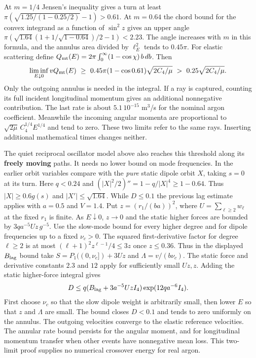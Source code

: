 \documentclass[11pt,a4paper]{article}
\begin{document}
At \(m=1/4\) Jensen's inequality gives a turn at least
\(\pi(\sqrt{1.25/(1-0.25/2)}-1)>0.61\). At \(m=0.64\) the chord bound
for the convex integrand as a function of \(\sin^2 z\) gives an upper
angle \(\pi(\sqrt{1.64}(1+1/\sqrt{1-0.64})/2-1)<2.23\). The angle
increases with \(m\) in this formula, and the annulus area divided by
\(\ell_E^2\) tends to \(0.45\pi\). For elastic scattering define
\(Q_{\rm mt}(E)=2\pi\int_0^\infty(1-\cos\chi)\,b\,db\). Then \[
 \liminf_{E\downarrow0}vQ_{\rm mt}(E)
 \ \ge\ 0.45\pi(1-\cos 0.61)\sqrt{2C_4/\mu}
 \ >\ 0.25\sqrt{2C_4/\mu}.
\] Only the outgoing annulus is needed in the integral. If a ray is
captured, counting its full incident longitudinal momentum gives an
additional nonnegative contribution. The last rate is about
\(5.1\,10^{-15}\) m\(^3\)/s for the nominal argon coefficient. Meanwhile
the incoming angular momenta are proportional to
\(\sqrt{2\mu}\,C_4^{1/4}E^{1/4}\) and tend to zero. These two limits
refer to the same rays. Inserting additional mathematical times changes
neither.

The quiet reciprocal oscillator model above also reaches this threshold
along its \textbf{freely moving} paths. It needs no lower bound on mode
frequencies. In the earlier orbit variables compare with the \emph{pure}
static dipole orbit \(X\), taking \(s=0\) at its turn. Here \(q<0.24\)
and \((|X|^2/2)''=1-q/|X|^4\ge1-0.64\). Thus \(|X|\ge0.6g(s)\) and
\(|X'|\le\sqrt{1.64}\). While \(D\le0.1\) the previous lag estimate
applies with \(a=0.5\) and \(V=1.4\). Put \(z=(r_1/(ba))^2\), where
\(U=\sum_{\ell\ge2}w_\ell\) at the fixed \(r_1\) is finite. As
\(E\downarrow0\), \(z\to0\) and the static higher forces are bounded by
\(3q a^{-5}Uz\,g^{-5}\). Use the slow-mode bound for every higher degree
and for dipole frequencies up to a fixed \(\nu_c>0\). The squared
first-derivative factor for degree \(\ell\ge2\) is at most
\((\ell+1)^2z^{\ell-1}/4\le3z\) once \(z\le0.36\). Thus in the displayed
\(B_{\rm lag}\) bound take \(S=P_1((0,\nu_c])+3Uz\) and
\(\Lambda=v/(b\nu_c)\). The static force and derivative constants
\(2.3\) and \(12\) apply for sufficiently small \(Uz,z\). Adding the
static higher-force integral gives \[
 D\le q(B_{\rm lag}+3a^{-5}Uz I_4)\exp(12q a^{-6}I_4).
\] First choose \(\nu_c\) so that the slow dipole weight is arbitrarily
small, then lower \(E\) so that \(z\) and \(\Lambda\) are small. The
bound closes \(D<0.1\) and tends to zero uniformly on the annulus. The
outgoing velocities converge to the elastic reference velocities. The
annular rate bound persists for the angular moment, and for longitudinal
momentum transfer when other events have nonnegative mean loss. This
two-limit proof supplies no numerical crossover energy for real argon.
\end{document}
